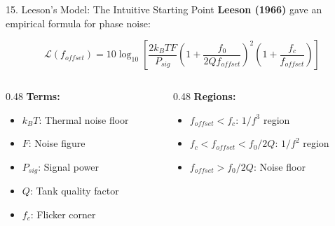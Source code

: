 \documentclass[aspectratio=169, 11pt]{beamer}
\begin{document}
\begin{frame}{15. Leeson's Model: The Intuitive Starting Point}
    \textbf{Leeson (1966)} gave an empirical formula for phase noise:

    \vspace{0.5em}
    \[ \mathcal{L}(f_{offset}) = 10\log_{10}\left[\frac{2k_B T F}{P_{sig}} \left(1 + \frac{f_0}{2Q f_{offset}}\right)^2 \left(1 + \frac{f_c}{f_{offset}}\right)\right] \]

    \vspace{0.5em}
    \begin{columns}[T]
        \begin{column}{0.48\textwidth}
            \textbf{Terms:}
            \begin{itemize}
                \item $k_B T$: Thermal noise floor
                \item $F$: Noise figure
                \item $P_{sig}$: Signal power
                \item $Q$: Tank quality factor
                \item $f_c$: Flicker corner
            \end{itemize}
        \end{column}
        \begin{column}{0.48\textwidth}
            \textbf{Regions:}
            \begin{itemize}
                \item $f_{offset} < f_c$: $1/f^3$ region
                \item $f_c < f_{offset} < f_0/2Q$: $1/f^2$ region
                \item $f_{offset} > f_0/2Q$: Noise floor
            \end{itemize}
        \end{column}
    \end{columns}
\end{frame}
\end{document}
